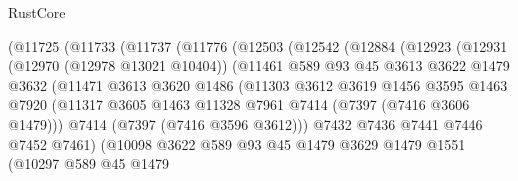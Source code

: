 \begin{lexlean}{RustCore}
\begin{coremodule}
                  (@11725
                    (@11733
                      (@11737
                        (@11776
                          (@12503
                            (@12542
                              (@12884
                                (@12923
                                  (@12931
                                    (@12970 (@12978 @13021 @10404))
                                    (@11461
                                      @589
                                      @93
                                      @45
                                      @3613
                                      @3622
                                      @1479
                                      @3632
                                      (@11471
                                        @3613
                                        @3620
                                        @1486
                                        (@11303
                                          @3612
                                          @3619
                                          @1456
                                          @3595
                                          @1463
                                          @7920
                                          (@11317
                                            @3605
                                            @1463
                                            @11328
                                            @7961
                                            @7414
                                            (@7397 (@7416 @3606 @1479)))
                                          @7414
                                          (@7397 (@7416 @3596 @3612)))
                                        @7432
                                        @7436
                                        @7441
                                        @7446
                                        @7452
                                        @7461)
                                      (@10098
                                        @3622
                                        @589
                                        @93
                                        @45
                                        @1479
                                        @3629
                                        @1479
                                        @1551
                                        (@10297
                                          @589
                                          @45
                                          @1479

\end{coremodule}
\end{lexlean}
